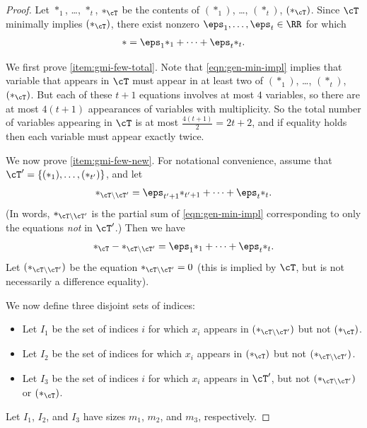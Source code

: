 \begin{proof}
    Let $*_1$, \ldots, $*_t$, $*_\cT$ be the contents of $(*_1)$, \ldots, $(*_t)$, $(*_\cT)$. Since $\cT$ minimally implies $(*_\cT)$, there exist nonzero $\eps_1, \ldots, \eps_t \in \RR$ for which 
    \begin{align}
        {*} = \eps_1{*_1} + \cdots + \eps_t{*_t}.\label{eqn:gen-min-impl}
    \end{align}

    We first prove \ref{item:gmi-few-total}. Note that \eqref{eqn:gen-min-impl} implies that variable that appears in $\cT$ must appear in at least two of $(*_1)$, \ldots, $(*_t)$, $(*_\cT)$. But each of these $t + 1$ equations involves at most $4$ variables, so there are at most $4(t + 1)$ appearances of variables with multiplicity. So the total number of variables appearing in $\cT$ is at most $\frac{4(t + 1)}{2} = 2t + 2$, and if equality holds then each variable must appear exactly twice. 

    We now prove \ref{item:gmi-few-new}. For notational convenience, assume that $\cT' = \{(*_1), \ldots, (*_{t'})\}$, and let 
    \begin{align}
        {*_{\cT \setminus \cT'}} = \eps_{t' + 1}{*_{t' + 1}} + \cdots + \eps_t{*_t}.\label{eqn:gmi-old}
    \end{align} 
    (In words, $*_{\cT \setminus \cT'}$ is the partial sum of \eqref{eqn:gen-min-impl} corresponding to only the equations \emph{not} in $\cT'$.) Then we have
    \begin{align}
        {*_\cT} - {*_{\cT \setminus \cT'}} = \eps_1{*_1} + \cdots + \eps_t{*_t}.\label{eqn:gmi-new-old}
    \end{align}
    Let $(*_{\cT \setminus \cT'})$ be the equation ${*_{\cT \setminus \cT'}} = 0$ (this is implied by $\cT$, but is not necessarily a difference equality).  

    We now define three disjoint sets of indices:
    \begin{itemize}
        \item Let $I_1$ be the set of indices $i$ for which $x_i$ appears in $(*_{\cT \setminus \cT'})$ but not $(*_\cT)$. 
        \item Let $I_2$ be the set of indices for which $x_i$ appears in $(*_\cT)$ but not $(*_{\cT \setminus \cT'})$. 
        \item Let $I_3$ be the set of indices $i$ for which $x_i$ appears in $\cT'$, but not $(*_{\cT \setminus \cT'})$ or $(*_\cT)$. 
    \end{itemize} 
    Let $I_1$, $I_2$, and $I_3$ have sizes $m_1$, $m_2$, and $m_3$, respectively. 


\end{proof}
